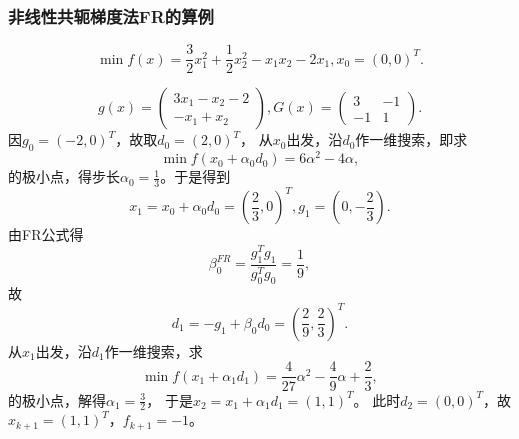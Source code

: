 \subsubsection{非线性共轭梯度法FR的算例}
\begin{example}
    \begin{equation}
        \min f(x) = \frac{3}{2}x_1^2+\frac{1}{2}x_2^2-x_1x_2-2x_1,
        x_0 = (0,0)^T.
    \nonumber
    \end{equation}
\end{example}
\begin{solution}
    \begin{equation}
        g(x) = 
        \begin{pmatrix}
            3x_1-x_2-2 \\
            -x_1+x_2  
        \end{pmatrix},
        G(x) = 
        \begin{pmatrix}
            3 & -1\\
            -1 & 1   
        \end{pmatrix}.
    \nonumber    
    \end{equation}
    因$g_0=(-2,0)^T$，故取$d_0=(2,0)^T$，
    从$x_0$出发，沿$d_0$作一维搜索，即求
    \begin{equation*}
    \min f(x_0+\alpha_0 d_0) = 6\alpha^2-4\alpha ,
    \end{equation*}
    的极小点，得步长$\alpha_0 = \frac{1}{3}$。于是得到
    \begin{equation*}
        x_1=x_0 + \alpha_0d_0=(\frac{2}{3},0)^T,
        g_1 = (0,-\frac{2}{3}).
    \end{equation*}
    由FR公式得
    \begin{equation*}
        \beta_{0}^{FR}=\displaystyle\frac{g_1^Tg_1}{g_{0}^Tg_{0}} = \frac{1}{9},
    \end{equation*}
    故
    \begin{equation*}
        d_1 = -g_1 + \beta_0d_0=(\frac{2}{9},\frac{2}{3})^T.
    \end{equation*}
    从$x_1$出发，沿$d_1$作一维搜索，求
    \begin{equation}
        \min f(x_1+\alpha_1 d_1) = 
        \frac{4}{27}\alpha^2-\frac{4}{9}\alpha + \frac{2}{3} ,
        \nonumber
    \end{equation}
    的极小点，解得$\alpha_1= \frac{3}{2}$，
    于是$x_2 = x_1 + \alpha_1d_1 = (1,1)^T$。
    此时$d_2=(0,0)^T$，故$x_{k+1}=(1,1)^T$，$f_{k+1} = -1$。
\end{solution}

